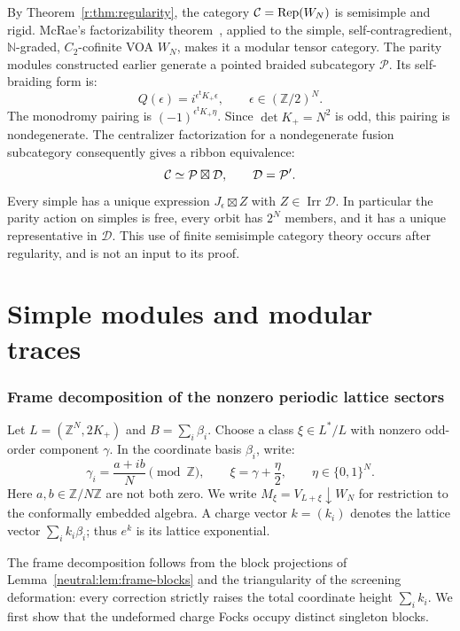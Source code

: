 \documentclass[11pt,a4paper]{article}
\numberwithin{equation}{section}
\theoremstyle{definition}\newtheorem{definition}[theorem]{Definition}
\theoremstyle{remark}\newtheorem{remark}[theorem]{Remark}
\newcommand{\Par}{\mathcal P}\newcommand{\Neu}{\mathcal D}
\begin{document}
By Theorem~\ref{r:thm:regularity}, the category
$\mathcal C=\operatorname{Rep}(W_N)$ is semisimple and rigid.
McRae's factorizability theorem~\cite[Theorem 5.3]{mcrae}, applied to
the simple, self-contragredient, $\mathbb N$-graded, $C_2$-cofinite
VOA $W_N$, makes it a modular tensor category. The parity modules constructed earlier generate
a pointed braided subcategory $\Par$. Its self-braiding form is:
\[
 Q(\epsilon)=i^{\epsilon^{\mathsf t}K_+\epsilon},
 \qquad \epsilon\in(\mathbb Z/2)^N.
\]
The monodromy pairing is $(-1)^{\epsilon^{\mathsf t}K_+\eta}$.
Since $\det K_+=N^2$ is odd, this pairing is nondegenerate.
The centralizer factorization for a nondegenerate fusion subcategory
\cite{dgno} consequently gives a ribbon equivalence:
\[
 \Cat\simeq\Par\boxtimes\Neu,\qquad \Neu=\Par'.
\]
Every simple has a unique expression $J_\epsilon\boxtimes Z$ with
$Z\in\operatorname{Irr}\Neu$. In particular the parity action on
simples is free, every orbit has $2^N$ members, and it has a unique
representative in $\Neu$. This use of finite semisimple category
theory occurs after regularity, and is not an input to its proof.

\part{Simple modules and modular traces}

\section{Frame decomposition of the nonzero periodic lattice sectors}
\label{g:sec:periodic-frame}
Let $L=(\mathbb Z^N,2K_+)$ and $B=\sum_i\beta_i$.  Choose a
class $\xi\in L^*/L$ with nonzero odd-order component $\gamma$.
In the coordinate basis $\beta_i$, write:
\[
 \gamma_i=\frac{a+ib}{N}\pmod{\mathbb Z},\qquad
 \xi=\gamma+\frac\eta2,\qquad \eta\in\{0,1\}^N.
\]
Here $a,b\in\mathbb Z/N\mathbb Z$ are not both zero.  We write
$M_\xi=V_{L+\xi}\downarrow W_N$ for restriction to the conformally
embedded algebra.  A charge vector $k=(k_i)$ denotes the lattice
vector $\sum_i k_i\beta_i$; thus $e^k$ is its lattice exponential.

The frame decomposition follows from the block projections of
Lemma~\ref{neutral:lem:frame-blocks} and the triangularity of the
screening deformation: every correction strictly raises the total
coordinate height $\sum_i k_i$.  We first show that the undeformed charge Focks
occupy distinct singleton blocks.
\end{document}
